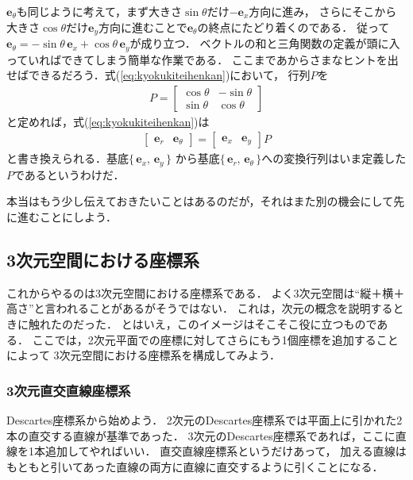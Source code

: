 $\bm{e}_\theta$も同じように考えて，まず大きさ$\sin \theta$だけ$-\bm{e}_x$方向に進み，
さらにそこから大きさ$\cos \theta$だけ$\bm{e}_y$方向に進むことで$\bm{e}_\theta$の終点にたどり着くのである．
従って$\bm{e}_\theta = - \sin \theta \, \bm{e}_x + \cos \theta \, \bm{e}_y$が成り立つ．
ベクトルの和と三角関数の定義が頭に入っていればできてしまう簡単な作業である．
ここまであからさまなヒントを出せばできるだろう．式(\ref{eq:kyokukiteihenkan})において，
行列$P$を
\begin{align*}
P = \left[
\begin{array}{cc}
\cos \theta & -\sin \theta \\
\sin \theta & \cos \theta
\end{array}
\right]
\end{align*}
と定めれば，式(\ref{eq:kyokukiteihenkan})は
\begin{align*}
\left[
\begin{array}{cc}
\bm{e}_r & \bm{e}_\theta 
\end{array}
\right]
=
\left[
\begin{array}{cc}
\bm{e}_x & \bm{e}_y
\end{array}
\right]
P
\end{align*}
と書き換えられる．基底$\{ \, \bm{e}_x , \, \bm{e}_y \, \} $
から基底$\{ \, \bm{e}_r , \, \bm{e}_\theta \, \}$への変換行列はいま定義した$P$であるというわけだ． 

本当はもう少し伝えておきたいことはあるのだが，それはまた別の機会にして先に進むことにしよう．

\subsection{3次元空間における座標系}
これからやるのは3次元空間における座標系である．
よく3次元空間は``縦＋横＋高さ''と言われることがあるがそうではない．
これは，次元の概念を説明するときに触れたのだった．
とはいえ，このイメージはそこそこ役に立つものである．
ここでは，2次元平面での座標に対してさらにもう1個座標を追加することによって
3次元空間における座標系を構成してみよう．
\subsubsection{3次元直交直線座標系}
Descartes座標系から始めよう．
2次元のDescartes座標系では平面上に引かれた2本の直交する直線が基準であった．
3次元のDescartes座標系であれば，ここに直線を1本追加してやればいい．
直交直線座標系というだけあって，
加える直線はもともと引いてあった直線の両方に直線に直交するように引くことになる．

